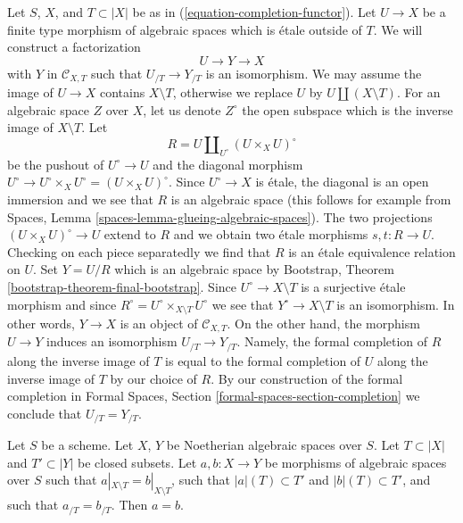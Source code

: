 \begin{remark}
\label{remark-smash-away-from-T}
Let $S$, $X$, and $T \subset |X|$ be as in (\ref{equation-completion-functor}).
Let $U \to X$ be a finite type morphism of algebraic spaces which is
\'etale outside of $T$. We will construct a factorization
$$
U \longrightarrow Y \longrightarrow X
$$
with $Y$ in $\mathcal{C}_{X, T}$ such that $U_{/T} \to Y_{/T}$ is an
isomorphism. We may assume the image of $U \to X$ contains
$X \setminus T$, otherwise we replace $U$ by $U \amalg (X \setminus T)$.
For an algebraic space $Z$ over $X$, let us denote $Z^\circ$
the open subspace which is the inverse image of $X \setminus T$.
Let
$$
R = U \amalg_{U^\circ} (U \times_X U)^\circ
$$
be the pushout of $U^\circ \to U$ and the diagonal morphism
$U^\circ \to U^\circ \times_X U^\circ = (U \times_X U)^\circ$.
Since $U^\circ \to X$ is \'etale, the diagonal is an open immersion
and we see that $R$ is an algebraic space (this follows for example
from Spaces, Lemma \ref{spaces-lemma-glueing-algebraic-spaces}).
The two projections $(U \times_X U)^\circ \to U$ extend to $R$
and we obtain two \'etale morphisms $s, t : R \to U$. Checking on each
piece separatedly we find that $R$ is an \'etale equivalence
relation on $U$. Set $Y = U/R$ which is an algebraic space by
Bootstrap, Theorem \ref{bootstrap-theorem-final-bootstrap}.
Since $U^\circ \to X \setminus T$ is a surjective \'etale morphism
and since $R^\circ = U^\circ \times_{X \setminus T} U^\circ$
we see that $Y^\circ \to X \setminus T$ is an isomorphism.
In other words, $Y \to X$ is an object of $\mathcal{C}_{X, T}$.
On the other hand, the morphism $U \to Y$ induces an isomorphism
$U_{/T} \to Y_{/T}$. Namely, the formal completion of $R$
along the inverse image of $T$ is equal to the formal completion of
$U$ along the inverse image of $T$ by our choice of $R$. By
our construction of the formal completion in
Formal Spaces, Section \ref{formal-spaces-section-completion}
we conclude that $U_{/T} = Y_{/T}$.
\end{remark}

\begin{lemma}
\label{lemma-faithful}
Let $S$ be a scheme. Let $X$, $Y$ be Noetherian algebraic spaces
over $S$. Let $T \subset |X|$ and $T' \subset |Y|$ be closed subsets.
Let $a, b : X \to Y$ be morphisms of algebraic spaces over $S$ such
that $a|_{X \setminus T} = b|_{X \setminus T}$, such that
$|a|(T) \subset T'$ and $|b|(T) \subset T'$, and such that $a_{/T} = b_{/T}$.
Then $a = b$.
\end{lemma}

